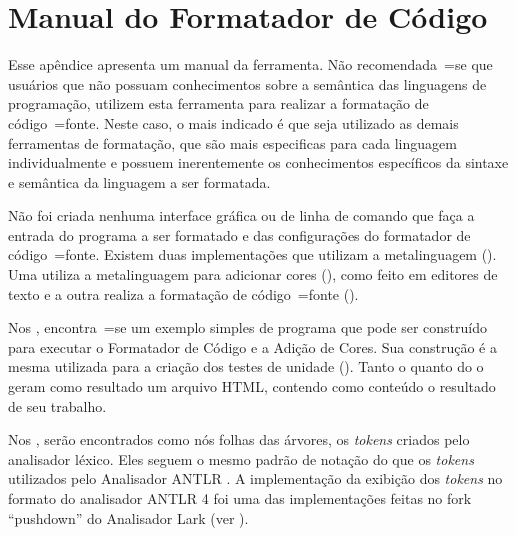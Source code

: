 

\chapter{Manual do Formatador de Código}
\label{manualDoFormatadorDeCodigo}


Esse apêndice apresenta um manual da ferramenta.
Não recomendada~=se que usuários que não possuam conhecimentos sobre a semântica das linguagens de programação,
utilizem esta ferramenta para realizar a formatação de código~=fonte.
Neste caso,
o mais indicado é que seja utilizado as demais ferramentas de formatação,
que são mais especificas para cada linguagem individualmente e
possuem inerentemente os conhecimentos específicos da sintaxe e
semântica da linguagem a ser formatada.

Não foi criada nenhuma interface gráfica ou
de linha de comando que faça a entrada do programa a ser formatado e
das configurações do formatador de código~=fonte.
Existem duas implementações que utilizam a metalinguagem ().
Uma utiliza a metalinguagem para adicionar cores (),
como feito em editores de texto e
a outra realiza a formatação de código~=fonte ().

Nos ,
encontra~=se um exemplo simples de programa que pode ser construído para executar o Formatador de Código e
a Adição de Cores.
Sua construção é a mesma utilizada para a criação dos testes de unidade ().
Tanto o  quanto do o  geram como resultado um arquivo HTML,
contendo como conteúdo o resultado de seu trabalho.

Nos ,
serão encontrados como nós folhas das árvores,
os \textit{tokens} criados pelo analisador léxico.
Eles seguem o mesmo padrão de notação do que os \textit{tokens} utilizados pelo Analisador ANTLR \cite{antlrBookTerrentParr}.
A implementação da exibição dos \textit{tokens} no formato do analisador ANTLR 4 foi uma das implementações feitas no fork ``pushdown'' do Analisador Lark (ver ).

